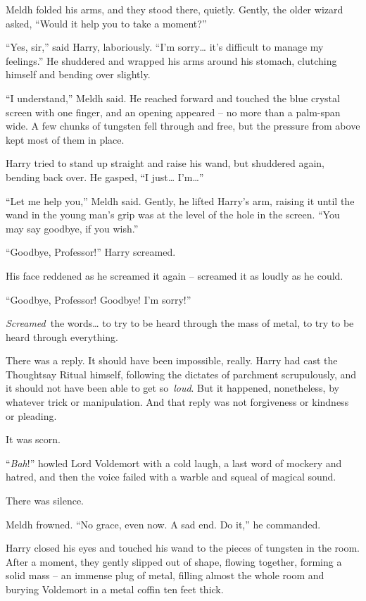 Meldh folded his arms, and they stood there, quietly. Gently, the older
wizard asked, ``Would it help you to take a moment?''

``Yes, sir,'' said Harry, laboriously. ``I'm sorry\ldots{} it's
difficult to manage my feelings.'' He shuddered and wrapped his arms
around his stomach, clutching himself and bending over slightly.

``I understand,'' Meldh said. He reached forward and touched the blue
crystal screen with one finger, and an opening appeared -- no more than
a palm-span wide. A few chunks of tungsten fell through and free, but
the pressure from above kept most of them in place.

Harry tried to stand up straight and raise his wand, but shuddered
again, bending back over. He gasped, ``I just\ldots{} I'm\ldots{}''

``Let me help you,'' Meldh said. Gently, he lifted Harry's arm, raising
it until the wand in the young man's grip was at the level of the hole
in the screen. ``You may say goodbye, if you wish.''

``Goodbye, Professor!'' Harry screamed.

His face reddened as he screamed it again -- screamed it as loudly as he
could.

``Goodbye, Professor! Goodbye! I'm sorry!''

\emph{Screamed}~the words\ldots{} to try to be heard through the mass of
metal, to try to be heard through everything.

There was a reply. It should have been impossible, really. Harry had
cast the Thoughtsay Ritual himself, following the dictates of parchment
scrupulously, and it should not have been able to get so~\emph{loud}.
But it happened, nonetheless, by whatever trick or manipulation. And
that reply was not forgiveness or kindness or pleading.

It was scorn.

``\emph{Bah}!'' howled Lord Voldemort with a cold laugh, a last word of
mockery and hatred, and then the voice failed with a warble and squeal
of magical sound.

There was silence.

Meldh frowned. ``No grace, even now. A sad end. Do it,'' he commanded.

Harry closed his eyes and touched his wand to the pieces of tungsten in
the room. After a moment, they gently slipped out of shape, flowing
together, forming a solid mass -- an immense plug of metal, filling
almost the whole room and burying Voldemort in a metal coffin ten feet
thick.

